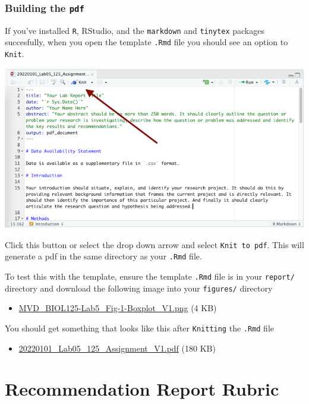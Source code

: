 \documentclass[
]{book}
\providecommand{\tightlist}{%
  \setlength{\itemsep}{0pt}\setlength{\parskip}{0pt}}
\begin{document}
\hypertarget{building-the-pdf}{%
\subsection*{\texorpdfstring{Building the \texttt{pdf}}{Building the pdf}}\label{building-the-pdf}}

If you've installed \texttt{R}, RStudio, and the \texttt{markdown} and \texttt{tinytex} packages succesfully, when you open the template \texttt{.Rmd} file you should see an option to \texttt{Knit}.

\includegraphics{images/Knit_20220101.png}

Click this button or select the drop down arrow and select \texttt{Knit\ to\ pdf}. This will generate a pdf in the same directory as your \texttt{.Rmd} file.

To test this with the template, ensure the template \texttt{.Rmd} file is in your \texttt{report/} directory and download the following image into your \texttt{figures/} directory

\begin{itemize}
\tightlist
\item
  \href{files/figures/MVD_BIOL125-Lab5_Fig-1-Boxplot_V1.png}{MVD\_BIOL125-Lab5\_Fig-1-Boxplot\_V1.png} (4 KB)
\end{itemize}

You should get something that looks like this after \texttt{Knitting} the \texttt{.Rmd} file

\begin{itemize}
\tightlist
\item
  \href{files/20220101_Lab05_125_Assignment_V1.pdf}{20220101\_Lab05\_125\_Assignment\_V1.pdf} (180 KB)
\end{itemize}

\hypertarget{recommendation-report-rubric-1}{%
\chapter*{Recommendation Report Rubric}\label{recommendation-report-rubric-1}}
\end{document}
